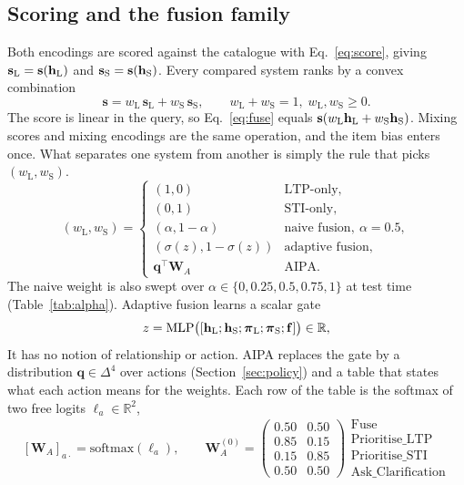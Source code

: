 \subsection{Scoring and the fusion family}
\label{sec:fusion}
Both encodings are scored against the catalogue with Eq.~\eqref{eq:score}, giving $\mathbf{s}_{\mathrm{L}}=\mathbf{s}(\mathbf{h}_{\mathrm{L}})$ and $\mathbf{s}_{\mathrm{S}}=\mathbf{s}(\mathbf{h}_{\mathrm{S}})$. Every compared system ranks by a convex combination
\begin{equation}
  \label{eq:fuse}
  \mathbf{s}=w_{\mathrm{L}}\,\mathbf{s}_{\mathrm{L}}+w_{\mathrm{S}}\,\mathbf{s}_{\mathrm{S}},\qquad w_{\mathrm{L}}+w_{\mathrm{S}}=1,\; w_{\mathrm{L}},w_{\mathrm{S}}\ge 0 .
\end{equation}
The score is linear in the query, so Eq.~\eqref{eq:fuse} equals $\mathbf{s}(w_{\mathrm{L}}\mathbf{h}_{\mathrm{L}}+w_{\mathrm{S}}\mathbf{h}_{\mathrm{S}})$. Mixing scores and mixing encodings are the same operation, and the item bias enters once. What separates one system from another is simply the rule that picks $(w_{\mathrm{L}},w_{\mathrm{S}})$.
\begin{equation}
  \label{eq:family}
  (w_{\mathrm{L}},w_{\mathrm{S}})=
  \begin{cases}
    (1,0) & \text{LTP-only},\\
    (0,1) & \text{STI-only},\\
    (\alpha,1-\alpha) & \text{naive fusion},\ \alpha=0.5,\\
    (\sigma(z),1-\sigma(z)) & \text{adaptive fusion},\\
    \mathbf{q}^{\!\top}\mathbf{W}_{\!A} & \text{AIPA}.
  \end{cases}
\end{equation}
The naive weight is also swept over $\alpha\in\{0,0.25,0.5,0.75,1\}$ at test time (Table~\ref{tab:alpha}). Adaptive fusion learns a scalar gate
\begin{equation}
  \label{eq:gate}
  z=\mathrm{MLP}\big([\mathbf{h}_{\mathrm{L}};\mathbf{h}_{\mathrm{S}};\boldsymbol{\pi}_{\mathrm{L}};\boldsymbol{\pi}_{\mathrm{S}};\mathbf{f}]\big)\in\mathbb{R},
\end{equation}
It has no notion of relationship or action. AIPA replaces the gate by a distribution $\mathbf{q}\in\Delta^{4}$ over actions (Section~\ref{sec:policy}) and a table that states what each action means for the weights. Each row of the table is the softmax of two free logits $\boldsymbol{\ell}_a\in\mathbb{R}^{2}$,
\begin{equation}
  \label{eq:wa}
  [\mathbf{W}_{\!A}]_{a\cdot}=\mathrm{softmax}(\boldsymbol{\ell}_a),\qquad
  \mathbf{W}_{\!A}^{(0)}=
  \begin{pmatrix}
    0.50 & 0.50\\ 0.85 & 0.15\\ 0.15 & 0.85\\ 0.50 & 0.50
  \end{pmatrix}
  \begin{array}{l}\text{Fuse}\\ \text{Prioritise\_LTP}\\ \text{Prioritise\_STI}\\ \text{Ask\_Clarification}\end{array}
\end{equation}
